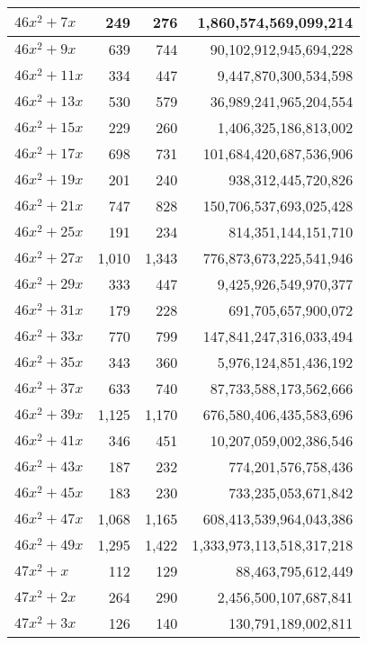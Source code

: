\documentclass[a4paper]{amsproc}
\theoremstyle{plain}
\theoremstyle{named}
\begin{document}
\begin{longtable}{ | l | r | r | r | }
$46x^2 + 7x$ & 249 & 276 & 1{,}860{,}574{,}569{,}099{,}214 \\ \hline
$46x^2 + 9x$ & 639 & 744 & 90{,}102{,}912{,}945{,}694{,}228 \\ \hline
$46x^2 + 11x$ & 334 & 447 & 9{,}447{,}870{,}300{,}534{,}598 \\ \hline
$46x^2 + 13x$ & 530 & 579 & 36{,}989{,}241{,}965{,}204{,}554 \\ \hline
$46x^2 + 15x$ & 229 & 260 & 1{,}406{,}325{,}186{,}813{,}002 \\ \hline
$46x^2 + 17x$ & 698 & 731 & 101{,}684{,}420{,}687{,}536{,}906 \\ \hline
$46x^2 + 19x$ & 201 & 240 & 938{,}312{,}445{,}720{,}826 \\ \hline
$46x^2 + 21x$ & 747 & 828 & 150{,}706{,}537{,}693{,}025{,}428 \\ \hline
$46x^2 + 25x$ & 191 & 234 & 814{,}351{,}144{,}151{,}710 \\ \hline
$46x^2 + 27x$ & 1{,}010 & 1{,}343 & 776{,}873{,}673{,}225{,}541{,}946 \\ \hline
$46x^2 + 29x$ & 333 & 447 & 9{,}425{,}926{,}549{,}970{,}377 \\ \hline
$46x^2 + 31x$ & 179 & 228 & 691{,}705{,}657{,}900{,}072 \\ \hline
$46x^2 + 33x$ & 770 & 799 & 147{,}841{,}247{,}316{,}033{,}494 \\ \hline
$46x^2 + 35x$ & 343 & 360 & 5{,}976{,}124{,}851{,}436{,}192 \\ \hline
$46x^2 + 37x$ & 633 & 740 & 87{,}733{,}588{,}173{,}562{,}666 \\ \hline
$46x^2 + 39x$ & 1{,}125 & 1{,}170 & 676{,}580{,}406{,}435{,}583{,}696 \\ \hline
$46x^2 + 41x$ & 346 & 451 & 10{,}207{,}059{,}002{,}386{,}546 \\ \hline
$46x^2 + 43x$ & 187 & 232 & 774{,}201{,}576{,}758{,}436 \\ \hline
$46x^2 + 45x$ & 183 & 230 & 733{,}235{,}053{,}671{,}842 \\ \hline
$46x^2 + 47x$ & 1{,}068 & 1{,}165 & 608{,}413{,}539{,}964{,}043{,}386 \\ \hline
$46x^2 + 49x$ & 1{,}295 & 1{,}422 & 1{,}333{,}973{,}113{,}518{,}317{,}218 \\ \hline
$47x^2 + x$ & 112 & 129 & 88{,}463{,}795{,}612{,}449 \\ \hline
$47x^2 + 2x$ & 264 & 290 & 2{,}456{,}500{,}107{,}687{,}841 \\ \hline
$47x^2 + 3x$ & 126 & 140 & 130{,}791{,}189{,}002{,}811 \\ \hline

\end{longtable}
\end{document}
